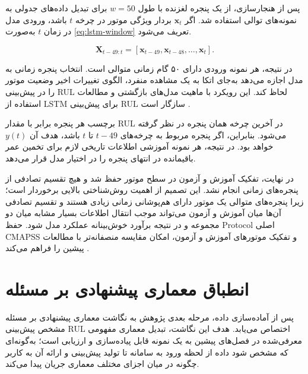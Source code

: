 \documentclass[a4paper,fleqn]{report}
\begin{document}
پس از هنجارسازی، از یک پنجره لغزنده با طول
$w=50$ برای تبدیل داده‌های جدولی به نمونه‌های توالی استفاده شد.
اگر $\mathbf{x}_t$ بردار ویژگی موتور در چرخه $t$ باشد، ورودی مدل
در زمان $t$ به‌صورت 
\ref{eq:lstm-window}
 تعریف می‌شود.

\begin{equation}
	\label{eq:lstm-window}
	\mathbf{X}_{t-49:t}
	=
	[
	\mathbf{x}_{t-49},
	\mathbf{x}_{t-48},
	\ldots,
	\mathbf{x}_{t}
	].
\end{equation}

در نتیجه، هر نمونه ورودی دارای ۵۰ گام زمانی متوالی است. انتخاب
پنجره زمانی به مدل اجازه می‌دهد به‌جای اتکا به یک مشاهده منفرد،
الگوی تغییرات اخیر وضعیت موتور را در پیش‌بینی \gls{RUL} لحاظ کند.
این رویکرد با ماهیت مدل‌های بازگشتی و مطالعات استفاده از LSTM برای
پیش‌بینی \gls{RUL} سازگار است \cite{heimes2008recurrent}.

برچسب هر پنجره برابر با مقدار \gls{RUL} در آخرین چرخه همان پنجره
در نظر گرفته می‌شود. بنابراین، اگر پنجره مربوط به چرخه‌های
$t-49$ تا $t$ باشد، هدف آن $y(t)$ خواهد بود. در نتیجه، هر نمونه
آموزشی اطلاعات تاریخی لازم برای تخمین عمر باقیمانده در انتهای
پنجره را در اختیار مدل قرار می‌دهد.

در نهایت، تفکیک آموزش و آزمون در سطح موتور حفظ شد و هیچ تقسیم
تصادفی از پنجره‌های زمانی انجام نشد. این تصمیم از اهمیت
روش‌شناختی بالایی برخوردار است؛ زیرا پنجره‌های متوالی یک موتور
دارای هم‌پوشانی زمانی زیادی هستند و تقسیم تصادفی آن‌ها میان
آموزش و آزمون می‌تواند موجب انتقال اطلاعات بسیار مشابه میان دو
مجموعه و در نتیجه برآورد خوش‌بینانه عملکرد مدل شود. حفظ \gls{Protocol}
اصلی \gls{CMAPSS} و تفکیک موتورهای آموزش و آزمون، امکان مقایسه منصفانه‌تر
با مطالعات پیشین را فراهم می‌کند \cite{NASA2007C-MAPSS}.





\section{انطباق معماری پیشنهادی بر مسئله }
\label{sec:arch-cmapss}

پس از آماده‌سازی داده، مرحله بعدی پژوهش به نگاشت معماری پیشنهادی
بر مسئله مشخص پیش‌بینی \gls{RUL} اختصاص می‌یابد. هدف این نگاشت،
تبدیل معماری مفهومی معرفی‌شده در فصل‌های پیشین به یک نمونه قابل
پیاده‌سازی و ارزیابی است؛ به‌گونه‌ای که مشخص شود داده از لحظه ورود
به سامانه تا تولید پیش‌بینی و ارائه آن به کاربر چگونه در میان
اجزای مختلف معماری جریان پیدا می‌کند.
\end{document}
